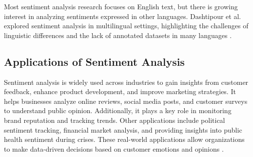 Most sentiment analysis research focuses on English text, but there is growing interest in analyzing sentiments expressed in other languages. Dashtipour et al. explored sentiment analysis in multilingual settings, highlighting the challenges of linguistic differences and the lack of annotated datasets in many languages \cite{Dashtipour2016}.

\subsection{Applications of Sentiment Analysis}

Sentiment analysis is widely used across industries to gain insights from customer feedback, enhance product development, and improve marketing strategies. It helps businesses analyze online reviews, social media posts, and customer surveys to understand public opinion. Additionally, it plays a key role in monitoring brand reputation and tracking trends. Other applications include political sentiment tracking, financial market analysis, and providing insights into public health sentiment during crises. These real-world applications allow organizations to make data-driven decisions based on customer emotions and opinions \cite{nobledesktop2024}.






